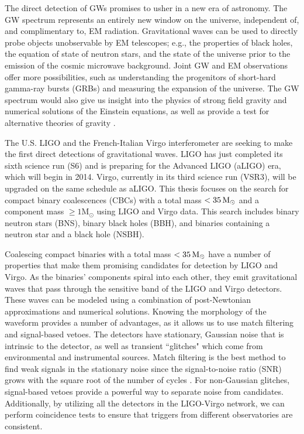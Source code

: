The direct detection of \acp{GW} promises to usher in a new era of astronomy. The \ac{GW} spectrum represents an entirely new window on the universe, independent of, and complimentary to, \ac{EM} radiation. Gravitational waves can be used to directly probe objects unobservable by EM telescopes; e.g., the properties of black holes, the equation of state of neutron stars, and the state of the universe prior to the emission of the cosmic microwave background. Joint GW and EM observations offer more possibilities, such as understanding the progenitors of short-hard gamma-ray bursts (GRBs) and measuring the expansion of the universe. The GW spectrum would also give us insight into the physics of strong field gravity and numerical solutions of the Einstein equations, as well as provide a test for alternative theories of gravity \cite{SathyaSchutz:livingReveiw:2009}.

The U.S. \ac{LIGO} and the French-Italian Virgo interferometer are seeking to make the first direct detections of gravitational waves. \ac{LIGO} has just completed its sixth science run (S6) and is preparing for the Advanced LIGO (aLIGO) era, which will begin in 2014. Virgo, currently in its third science run (VSR3), will be upgraded on the same schedule as aLIGO. This thesis focuses on the search for compact binary coalescences (CBCs) with a total mass $< 35\,\mathrm{M_\odot}$ and a component mass $\mathrm{\geq 1M_\odot}$ using LIGO and Virgo data. This search includes binary neutron stars (BNS), binary black holes (BBH), and binaries containing a neutron star and a black hole (NSBH).

Coalescing compact binaries with a total mass $< 35\,\mathrm{M_\odot}$ have a number of properties that make them promising candidates for detection by LIGO and Virgo. As the binaries' components spiral into each other, they emit gravitational waves that pass through the sensitive band of the LIGO and Virgo detectors. These waves can be modeled using a combination of post-Newtonian approximations and numerical solutions. Knowing the morphology of the waveform provides a number of advantages, as it allows us to use match filtering and signal-based vetoes. The detectors have stationary, Gaussian noise that is intrinsic to the detector, as well as transient ``glitches" which come from environmental and instrumental sources. Match filtering is the best method to find weak signals in the stationary noise since the signal-to-noise ratio (SNR) grows with the square root of the number of cycles \cite{SathyaSchutz:livingReveiw:2009}. For non-Gaussian glitches, signal-based vetoes provide a powerful way to separate noise from candidates. Additionally, by utilizing all the detectors in the LIGO-Virgo network, we can perform coincidence tests to ensure that triggers from different observatories are consistent.

